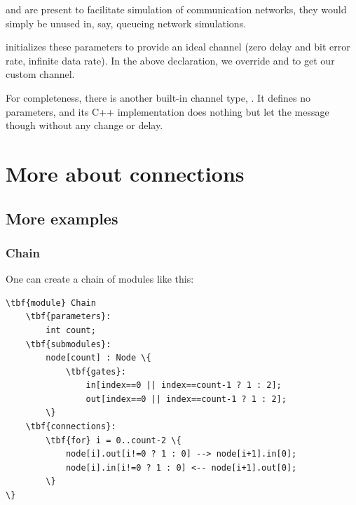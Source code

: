 \begin{note}
     and  are present to facilitate simulation of
    communication networks, they would simply be unused in, say, queueing
    network simulations.
\end{note}

 initializes these parameters to provide an ideal channel
(zero delay and bit error rate, infinite data rate). In the above
declaration, we override  and  to get our custom
channel.

For completeness, there is another built-in channel type,
. It defines no parameters, and its C++ implementation
does nothing but let the message though without any change or delay.

%



\section{More about connections}

\subsection{More examples}

\subsubsection{Chain}

One can create a chain of modules like this:

\begin{Verbatim}[commandchars=\\\{\}]
\tbf{module} Chain
    \tbf{parameters}:
        int count;
    \tbf{submodules}:
        node[count] : Node \{
            \tbf{gates}:
                in[index==0 || index==count-1 ? 1 : 2];
                out[index==0 || index==count-1 ? 1 : 2];
        \}
    \tbf{connections}:
        \tbf{for} i = 0..count-2 \{
            node[i].out[i!=0 ? 1 : 0] --> node[i+1].in[0];
            node[i].in[i!=0 ? 1 : 0] <-- node[i+1].out[0];
        \}
\}
\end{Verbatim}


